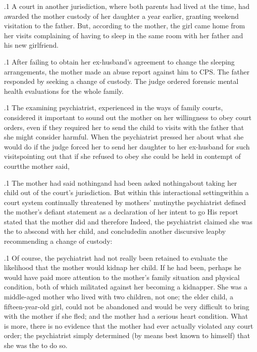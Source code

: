\documentclass[11pt, twoside]{article}
\begin{document}
{\p.1{%
A court in another jurisdiction, where both parents had lived at the
time, had awarded the mother custody of her daughter a year earlier,
granting weekend visitation to the father. But, according to the mother,
the girl came home from her visits complaining of having to sleep in the
same room with her father and his new girlfriend.
}%

\p.1{%
After failing to obtain her ex-husband’s agreement to change the
sleeping arrangements, the mother made an abuse report against him
to CPS. The father responded by seeking a change of custody. The judge
ordered forensic mental health evaluations for the whole family.
}%

\p.1{%
The examining psychiatrist, experienced in the ways of family courts,
considered it important to sound out the mother on her willingness to
obey court orders, even if they required her to send the child to visits
with the father that she might consider harmful. When the psychiatrist
pressed her about what she would do if the judge forced her to send
her daughter to her ex-husband for such visits\mdash{}pointing out that if she
refused to obey she could be held in contempt of court\mdash{}the mother
said, 
}%

\p.1{%
The mother had said nothing\mdash{}and had been asked nothing\mdash{}about
taking her child out of the court’s jurisdiction. But within this interactional setting\mdash{}within a court system continually threatened by
mothers’ mutiny\mdash{}the psychiatrist  defined the mother’s defiant statement as a declaration of her intent to go  His
report stated that the mother did  and therefore  Indeed, the
psychiatrist claimed she was the  to abscond with her child, and
concluded\mdash{}in another discursive leap\mdash{}by recommending a change of
custody: 
}%

\p.1{%
Of course, the psychiatrist had not really been retained to evaluate the
likelihood that the mother would kidnap her child. If he had been, perhaps he would have paid more attention to the mother’s family situation
and physical condition, both of which militated against her becoming a
kidnapper. She was a middle-aged mother who lived with two children,
not one; the elder child, a fifteen-year-old girl, could not be abandoned
and would be very difficult to bring with the mother if she
fled; and the mother had a serious heart condition. What is more, there is
no evidence that the mother had ever actually violated any court order;
the psychiatrist simply determined (by means best known to himself)
that she was the  to do so.
}%

}
\end{document}
